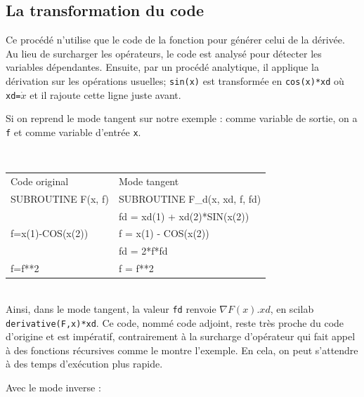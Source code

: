 \subsection{La transformation du code}
Ce proc\'ed\'e n'utilise que le code de la fonction pour g\'en\'erer celui de la d\'eriv\'ee.
Au lieu de surcharger les op\'erateurs, le code est analys\'e pour d\'etecter les variables d\'ependantes.
Ensuite, par un proc\'ed\'e analytique, il applique la d\'erivation sur les op\'erations usuelles; 
{\tt sin(x)} est transform\'ee en {\tt cos(x)*xd} o\`u {\tt xd=}$\dot x$ et il rajoute cette ligne
juste avant.

 Si on reprend le mode tangent sur notre exemple : comme variable de sortie, on a {\tt f} et 
comme variable d'entr\'ee {\tt x}.\\


{\tt
\begin{tabular}{|l|l|}
  \hline
  Code original & Mode tangent \\
  SUBROUTINE F(x, f) & SUBROUTINE F\_d(x, xd, f, fd) \\
  \hline
			& fd = xd(1) + xd(2)*SIN(x(2)) \\
    f=x(1)-COS(x(2))	& f = x(1) - COS(x(2))\\
			& fd = 2*f*fd\\
    f=f**2    		& f = f**2\\  
  \hline
\end{tabular}
}\\

Ainsi, dans le mode tangent, la valeur {\tt fd} renvoie $\nabla F(x).xd$, en scilab \\ 
{\tt derivative(F,x)*xd}.
Ce code, nomm\'e code adjoint, reste tr\`es proche du code d'origine et est imp\'eratif, contrairement \`a la surcharge d'op\'erateur qui fait 
appel \`a des fonctions r\'ecursives comme le montre l'exemple. En cela, on peut s'attendre \`a des temps d'ex\'ecution plus rapide.

Avec le mode inverse : \\


